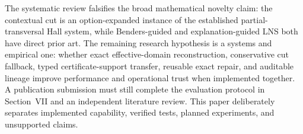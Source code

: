 The systematic review falsifies the broad mathematical novelty claim: the contextual cut is an option-expanded instance of the established partial-transversal Hall system, while Benders-guided and explanation-guided LNS both have direct prior art.
The remaining research hypothesis is a systems and empirical one: whether exact effective-domain reconstruction, conservative cut fallback, typed certificate-support transfer, reusable exact repair, and auditable lineage improve performance and operational trust when implemented together.
A publication submission must still complete the evaluation protocol in Section~VII and an independent literature review.
This paper deliberately separates implemented capability, verified tests, planned experiments, and unsupported claims.
